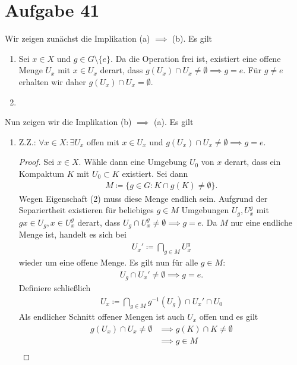 \documentclass{article}
\begin{document}
  \section*{Aufgabe 41}
  Wir zeigen zunächst die Implikation (a) $\implies$ (b). Es gilt
  \begin{enumerate}[(1)]
    \item Sei $x\in X$ und $g\in G\setminus\{e\}$. Da die Operation frei ist, existiert eine offene Menge $U_x$ mit $x\in U_x$ derart, 
    dass $g(U_x) \cap U_x \neq \emptyset \implies g = e$. Für $g\neq e$ erhalten wir daher
    $g(U_x) \cap U_x = \emptyset$.
    \item 
  \end{enumerate}
  Nun zeigen wir die Implikation (b) $\implies$ (a). Es gilt
  \begin{enumerate}[(1)]
    \item Z.Z.: $\forall x \in X: \exists U_x$ offen mit $x\in U_x$ und $g(U_x) \cap U_x \neq \emptyset \implies g = e$.
    \begin{proof}
      Sei $x \in X$. Wähle dann eine Umgebung $U_0$ von $x$ derart, dass ein Kompaktum $K$ mit $U_0 \subset K$ existiert.
      Sei dann
      \begin{align*}
        M \coloneqq \{g \in G\colon K\cap g(K) \neq \emptyset\}.
      \end{align*}
      Wegen Eigenschaft (2) muss diese Menge endlich sein.
      Aufgrund der Separiertheit existieren für beliebiges $g \in M$ Umgebungen $U_g, U_x^g$ mit $gx \in U_g, x\in U_x^g$ derart, 
      dass $U_g \cap U_x^g \neq \emptyset \implies g = e$. Da $M$ nur eine endliche Menge ist, handelt es sich bei 
      \begin{align*}
        U_x' \coloneqq \bigcap_{g\in M} U_x^g
      \end{align*}
      wieder um eine offene Menge.
      Es gilt nun für alle $g\in M$: 
      \begin{align*}
        U_g \cap U_x' \neq \emptyset \implies g = e.
      \end{align*}
      Definiere schließlich
      \begin{align*}
        U_x \coloneqq \bigcap_{g\in M} g^{-1}(U_g) \cap U_x' \cap U_0
      \end{align*}
      Als endlicher Schnitt offener Mengen ist auch $U_x$ offen und es gilt
      \begin{align*}
        g(U_x) \cap U_x \neq \emptyset &\implies g(K) \cap K \neq \emptyset\\
        &\implies g \in M\\

\end{align*}
\end{proof}
\end{enumerate}
\end{document}
